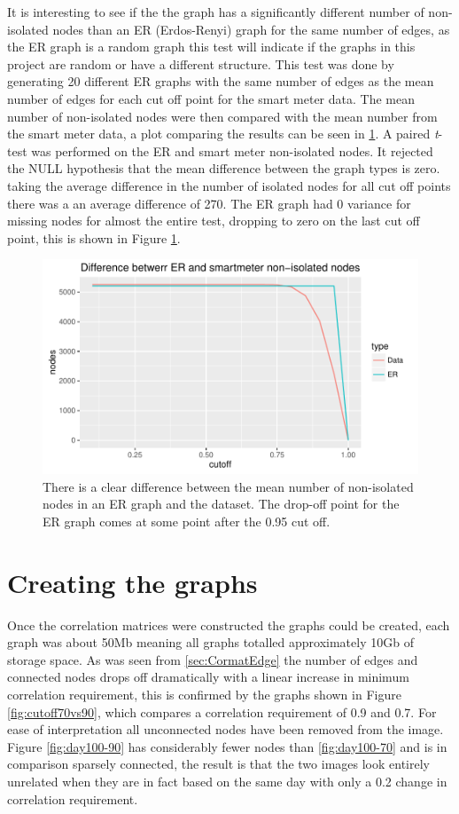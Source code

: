 It is interesting to see if the the graph has a significantly different number of non-isolated nodes than an ER (Erdos-Renyi) graph for the same number of edges, as the ER graph is a random graph this test will indicate if the graphs in this project are random or have a different structure. This test was done by generating 20 different ER graphs with the same number of edges as the mean number of edges for each cut off point for the smart meter data. The mean number of non-isolated nodes were then compared with the mean number from the smart meter data, a plot comparing the results can be seen in \ref{fig:DataVsER}. A paired \textit{t}-test was performed on the ER and smart meter non-isolated nodes. It rejected the NULL hypothesis that the mean difference between the graph types is zero. taking the average difference in the number of isolated nodes for all cut off points there was a an average difference of 270. The ER graph had 0 variance for missing nodes for almost the entire test, dropping to zero on the last cut off point, this is shown in Figure \ref{fig:DataVsER}. 

\begin{figure}[ht]
    \centering
    \includegraphics{Figures/Results/DataVsER}
    \caption[ER \& Data edge comparison]{There is a clear difference between the mean number of non-isolated nodes in an ER graph and the dataset. The drop-off point for the ER graph comes at some point after the 0.95 cut off.}
    \label{fig:DataVsER}
\end{figure}

\section{Creating the graphs}
Once the correlation matrices were constructed the graphs could be created, each graph was about 50Mb meaning all graphs totalled approximately 10Gb of storage space. As was seen from \ref{sec:CormatEdge} the number of edges and connected nodes drops off dramatically with a linear increase in minimum correlation requirement, this is confirmed by the graphs shown in Figure \ref{fig:cutoff70vs90}, which compares a correlation requirement of 0.9 and 0.7. For ease of interpretation all unconnected nodes have been removed from the image. Figure \ref{fig:day100-90} has considerably fewer nodes than \ref{fig:day100-70} and is in comparison sparsely connected, the result is that the two images look entirely unrelated when they are in fact based on the same day with only a 0.2 change in correlation requirement. 

